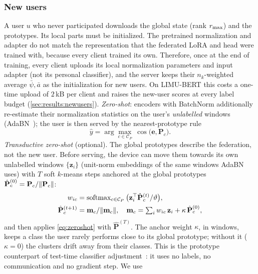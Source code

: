 \subsubsection{New users}
A user $u$ who never participated downloads the global state (rank $r_{\max}$) and the prototypes.
Its local parts must be initialized. The pretrained normalization and adapter do not match the
representation that the federated LoRA and head were trained with, because every client trained
its own. Therefore, once at the end of training, every client uploads its local normalization
parameters and input adapter (not its personal classifier), and the server keeps their
$n_k$-weighted average $\bar{\psi},\bar{a}$ as the initialization for new users. On LIMU-BERT this
costs a one-time upload of $2$\,kB per client and raises the new-user scores at every label budget
(\cref{sec:results:newusers}).
\emph{Zero-shot}: encoders with BatchNorm additionally re-estimate their normalization statistics on
the user's \emph{unlabelled} windows (AdaBN~\cite{li2018adabn}); the user is then served by the
nearest-prototype rule
\begin{equation}\label{eq:zeroshot}
  \hat{y}=\arg\max_{c\in\mathcal{C}_P}\ \cos\big(\mathbf{e},\mathbf{P}_c\big).
\end{equation}
\emph{Transductive zero-shot} (optional). The global prototypes describe the federation, not the
new user. Before serving, the device can move them towards its own unlabelled windows
$\{\mathbf{z}_i\}$ (unit-norm embeddings of the same windows AdaBN uses) with $T$ soft $k$-means
steps anchored at the global prototypes $\hat{\mathbf{P}}^{(0)}_c=\mathbf{P}_c/\lVert \mathbf{P}_c\rVert$:
\begin{equation}\label{eq:refine}
\begin{aligned}
  w_{ic}&=\operatorname{softmax}_{c\in\mathcal{C}_P}\big(\mathbf{z}_i^\top\hat{\mathbf{P}}^{(t)}_c/\vartheta\big),\\
  \hat{\mathbf{P}}^{(t+1)}_c&=\mathbf{m}_c/\lVert \mathbf{m}_c\rVert,\quad
  \mathbf{m}_c=\textstyle\sum_i w_{ic}\,\mathbf{z}_i+\kappa\,\hat{\mathbf{P}}^{(0)}_c,
\end{aligned}
\end{equation}
and then applies \cref{eq:zeroshot} with $\hat{\mathbf{P}}^{(T)}$. The anchor weight $\kappa$, in windows,
keeps a class the user rarely performs close to its global prototype; without it ($\kappa=0$) the
clusters drift away from their classes. This is the prototype counterpart of test-time classifier
adjustment~\cite{iwasawa2021t3a}: it uses no labels, no communication and no gradient step. We use

